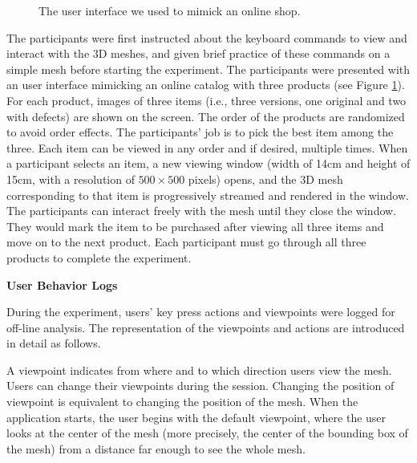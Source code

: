 \begin{figure}
    \centering
    \caption{The user interface we used to mimick an online shop.}
    \label{f:user:shop}
\end{figure}
The participants were first instructed about the keyboard commands 
to view and interact with the 3D meshes, and given brief practice of
these commands on a simple mesh before starting the experiment. The
participants were presented with an user interface mimicking an online
catalog with three products (see Figure \ref{f:user:shop}).  For each product, images of three items 
(i.e., three versions, one original and two with defects) are shown on the screen.
The order of the products are randomized to avoid order effects.
The participants' job is to pick the best item among the three. Each item 
can be viewed in any order and if desired, multiple times.  When 
a participant selects an item, a new viewing window (width of 14cm and
height of 15cm, with a resolution of $500 \times 500$ pixels) opens, and the 3D mesh corresponding to that item is
progressively streamed and rendered in the window.  
The participants can interact freely
with the mesh until they close the window.
They would mark the item to be purchased after viewing all three items and
move on to the next product. Each participant must go through all three products to
complete the experiment.

\textbf{User Behavior Logs}

During the experiment, users' key press actions and viewpoints
were logged for off-line analysis. The representation of the viewpoints
and actions are introduced in detail as follows.

A viewpoint indicates from where and to which direction users view the mesh.
Users can change their viewpoints during the session. Changing the position of 
viewpoint is equivalent to changing the position of the mesh. 
When the application starts, the user begins with the default viewpoint,
where the user looks at the center of the mesh (more precisely,  the center of the bounding box of the mesh)
from a distance far enough to see the whole mesh. 

